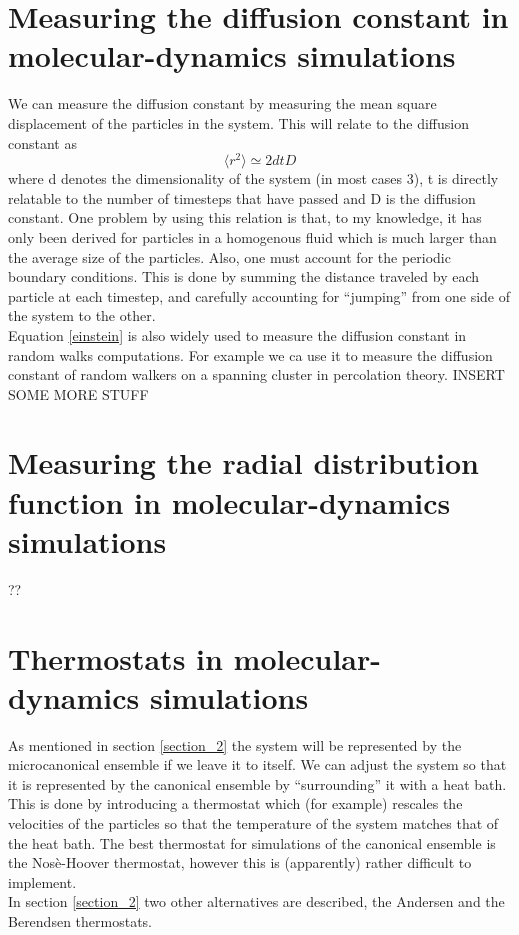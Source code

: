 \documentclass[a4paper,english, 10pt, twoside]{article}
\begin{document}
\section{Measuring the diffusion constant in molecular-dynamics simulations}\label{section_4}
We can measure the diffusion constant by measuring the mean square displacement of the particles in the system. 
This will relate to the diffusion constant as 
\begin{equation}\label{einstein}
 \langle r^2\rangle \simeq 2dtD
\end{equation}
where d denotes the dimensionality of the system (in most cases 3), t is directly relatable to the number of 
timesteps that have passed and D is the diffusion constant. One problem by using this relation is that, to 
my knowledge, it has only been derived for particles in a homogenous fluid which is much larger than the average 
size of the particles. Also, one must account for the periodic boundary conditions. This is done by summing the 
distance traveled by each particle at each timestep, and carefully accounting for ``jumping'' from one side of 
the system to the other.\\
Equation \ref{einstein} is also widely used to measure the diffusion constant in random walks computations. 
For example we ca use it to measure the diffusion constant of random walkers on a spanning cluster in percolation 
theory. INSERT SOME MORE STUFF

\section{Measuring the radial distribution function in molecular-dynamics simulations}
??

\section{Thermostats in molecular-dynamics simulations}
As mentioned in section \ref{section_2} the system will be represented by the microcanonical ensemble if we leave it to 
itself. We can adjust the system so that it is represented by the canonical ensemble by ``surrounding'' it with 
a heat bath. This is done by introducing a thermostat which (for example) rescales the velocities of the particles 
so that the temperature of the system matches that of the heat bath. The best thermostat for simulations of the 
canonical ensemble is the Nosè-Hoover thermostat, however this is (apparently) rather difficult to implement.\\
In section \ref{section_2} two other alternatives are described, the Andersen and the Berendsen thermostats.
\end{document}
